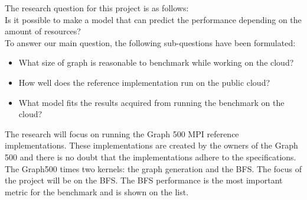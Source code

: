 The research question for this project is as follows: \\
Is it possible to make a model that can predict the performance depending on the amount of resources? \\
To answer our main question, the following sub-questions have been formulated: 
\begin{itemize}
\item What size of graph is reasonable to benchmark while working on the cloud?
\item How well does the reference implementation\cite{graph500-code} run on the public cloud?
\item What model fits the results acquired from running the benchmark on the cloud?
\end{itemize}

The research will focus on running the Graph 500 MPI reference implementations. These implementations are created by the owners of the Graph 500 and there is no doubt that the implementations adhere to the specifications. The Graph500 times two kernels: the graph generation and the BFS. The focus of the project will be on the BFS. The BFS performance is the most important metric for the benchmark and is shown on the list.